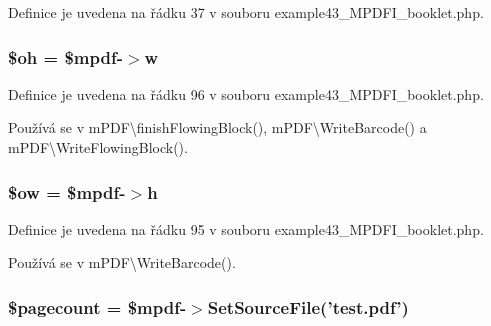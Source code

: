 Definice je uvedena na řádku 37 v souboru example43\-\_\-\-M\-P\-D\-F\-I\-\_\-booklet.\-php.

\hypertarget{example43___m_p_d_f_i__booklet_8php_ab09fc7575b29981b0adffe6e400fdd8e}{
\subsubsection[{\$oh}]{\setlength{\rightskip}{0pt plus 5cm}\$oh = \$mpdf-\/$>$w}}\label{example43___m_p_d_f_i__booklet_8php_ab09fc7575b29981b0adffe6e400fdd8e}


Definice je uvedena na řádku 96 v souboru example43\-\_\-\-M\-P\-D\-F\-I\-\_\-booklet.\-php.



Používá se v m\-P\-D\-F\textbackslash{}finish\-Flowing\-Block(), m\-P\-D\-F\textbackslash{}\-Write\-Barcode() a m\-P\-D\-F\textbackslash{}\-Write\-Flowing\-Block().

\hypertarget{example43___m_p_d_f_i__booklet_8php_a07c2862e5c638968feec8053b50abae5}{
\subsubsection[{\$ow}]{\setlength{\rightskip}{0pt plus 5cm}\$ow = \$mpdf-\/$>$h}}\label{example43___m_p_d_f_i__booklet_8php_a07c2862e5c638968feec8053b50abae5}


Definice je uvedena na řádku 95 v souboru example43\-\_\-\-M\-P\-D\-F\-I\-\_\-booklet.\-php.



Používá se v m\-P\-D\-F\textbackslash{}\-Write\-Barcode().

\hypertarget{example43___m_p_d_f_i__booklet_8php_a905390c82ddf2d57cc0c524f4e5b0425}{
\subsubsection[{\$pagecount}]{\setlength{\rightskip}{0pt plus 5cm}\$pagecount = \$mpdf-\/$>$Set\-Source\-File('test.\-pdf')}}\label{example43___m_p_d_f_i__booklet_8php_a905390c82ddf2d57cc0c524f4e5b0425}


